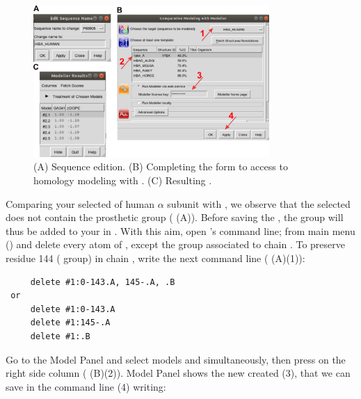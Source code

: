   \begin{figure}[H]
  \centering 
  \captionsetup{width=.7\linewidth} 
  \includegraphics[width=0.80\textwidth]{Images/Fig15}
  \caption{(A) Sequence edition. (B) Completing the form to access to homology modeling with \modeller. (C) Resulting .}
  \label{fig:modeller}
  \end{figure}
 
 Comparing your selected  of human  $\alpha$ subunit with  , we observe that the selected   does not contain the  prosthetic group ( (A)). Before saving the , the   group will thus be added to your  in \chimera. With this aim, open \chimera's command line; from \chimera main menu () and delete every atom of  , except the  group associated to chain . To preserve residue 144 ( group) in chain , write the next command line ( (A)(1)):
 \begin{verbatim}
     delete #1:0-143.A, 145-.A, .B
 or
     delete #1:0-143.A
     delete #1:145-.A
     delete #1:.B
 \end{verbatim}
 
 Go to the Model Panel and select models  and  simultaneously, then press  on the right side column ( (B)(2)). Model Panel shows the new  created  (3), that we can save in the command line (4) writing:\\

 \\
 
